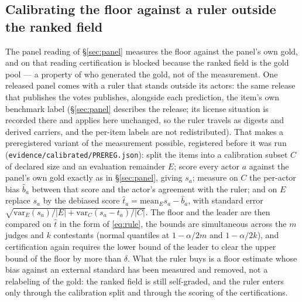 \documentclass{article}
\newcommand{\ids}[1]{\texttt{\small #1}} %
\begin{document}
\subsection{Calibrating the floor against a ruler outside the ranked field}
\label{sec:calibrated}
The panel reading of \S\ref{sec:panel} measures the floor against the panel's own
gold, and on that reading certification is blocked because the ranked field is the
gold pool --- a property of who generated the gold, not of the measurement. One
released panel comes with a ruler that stands outside its actors: the same release
that publishes the votes publishes, alongside each prediction, the item's own
benchmark label (\S\ref{sec:panel} describes the release; its license situation is
recorded there and applies here unchanged, so the ruler travels as digests and
derived carriers, and the per-item labels are not redistributed). That makes a
preregistered variant of the measurement possible, registered before it was run
(\ids{evidence/calibrated/PREREG.json}): split the items into a calibration subset
$C$ of declared size and an evaluation remainder $E$; score every actor $a$ against
the panel's own gold exactly as in \S\ref{sec:panel}, giving $s_a$; measure on $C$
the per-actor bias $\hat b_a$ between that score and the actor's agreement with the
ruler; and on $E$ replace $s_a$ by the debiased score
$\hat t_a = \mathrm{mean}_E s_a - \hat b_a$, with standard error
$\sqrt{\mathrm{var}_E(s_a)/|E| + \mathrm{var}_C(s_a - t_a)/|C|}$. The floor and the
leader are then compared on $\hat t$ in the form of \eqref{eq:rule}, the bounds are
simultaneous across the $m$ judges and $k$ contestants (normal quantiles at
$1-\alpha/2m$ and $1-\alpha/2k$), and certification again requires the lower bound
of the leader to clear the upper bound of the floor by more than $\delta$. What the
ruler buys is a floor estimate whose bias against an external standard has been
measured and removed, not a relabeling of the gold: the ranked field is still
self-graded, and the ruler enters only through the calibration split and through
the scoring of the certifications.
\end{document}
